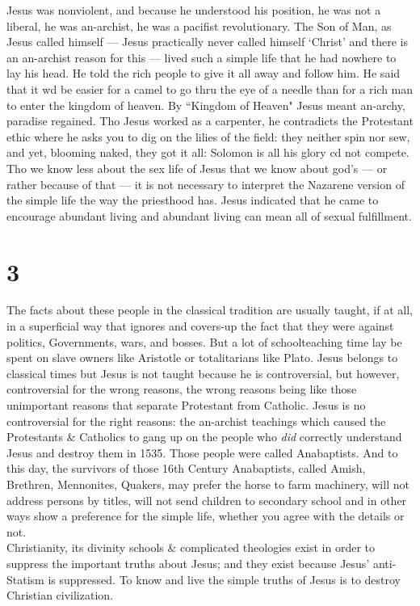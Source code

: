 Jesus was nonviolent, and because he understood his position, he was not a liberal, he was an-archist, he was a pacifist revolutionary. The Son of Man, as Jesus called himself --- Jesus practically never called himself `Christ' and there is an an-archist reason for this --- lived such a simple life that he had nowhere to lay his head. He told the rich people to give it all away and follow him. He said that it wd be easier for a camel to go thru the eye of a needle than for a rich man to enter the kingdom of heaven. By ``Kingdom of Heaven" Jesus meant an-archy, paradise regained. Tho Jesus worked as a carpenter, he contradicts the Protestant ethic where he asks you to dig on the lilies of the field: they neither spin nor sew, and yet, blooming naked, they got it all: Solomon is all his glory cd not compete. Tho we know less about the sex life of Jesus that we know about god's --- or rather because of that --- it is not necessary to interpret the Nazarene version of the simple life the way the priesthood has. Jesus indicated that he came to encourage abundant living and abundant living can mean all of sexual fulfillment.

\section*{3}
The facts about these people in the classical tradition are usually taught, if at all, in a superficial way that ignores and covers-up the fact that they were against politics, Governments, wars, and bosses. But a lot of schoolteaching time lay be spent on slave owners like Aristotle or totalitarians like Plato. Jesus belongs to classical times but Jesus is not taught because he is controversial, but however, controversial for the wrong reasons, the wrong reasons being like those unimportant reasons that separate Protestant from Catholic. Jesus is no controversial for the right reasons: the an-archist teachings which caused the Protestants \& Catholics to gang up on the people who \emph{did} correctly understand Jesus and destroy them in 1535. Those people were called Anabaptists. And to this day, the survivors of those 16th Century Anabaptists, called Amish, Brethren, Mennonites, Quakers, may prefer the horse to farm machinery, will not address persons by titles, will not send children to secondary school and in other ways show a preference for the simple life, whether you agree with the details or not.\\
Christianity, its divinity schools \& complicated theologies exist in order to suppress the important truths about Jesus; and they exist because Jesus' anti-Statism is suppressed. To know and live the simple truths of Jesus is to destroy Christian civilization.

